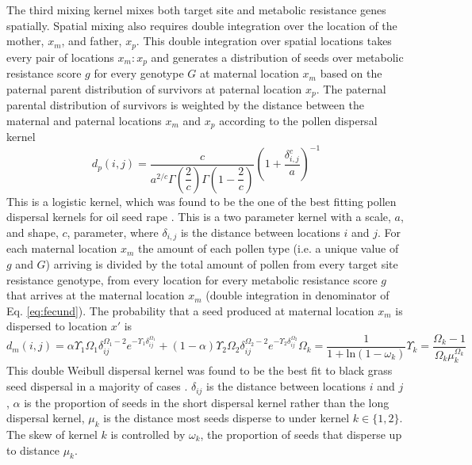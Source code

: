 \documentclass[12pt, a4paper]{article}
\begin{document}
The third mixing kernel mixes both target site and metabolic resistance genes spatially. Spatial mixing also requires double integration over the location of the mother, $x_m$, and father, $x_p$. This double integration over spatial locations takes every pair of locations $x_m:x_p$ and generates a distribution of seeds over metabolic resistance score $g$ for every genotype $G$ at maternal location $x_m$ based on the paternal parent distribution of survivors at paternal location $x_p$. The paternal parental distribution of survivors is weighted by the distance between the maternal and paternal locations $x_m$ and $x_p$ according to the pollen dispersal kernel 
\begin{equation}\label{eq:pollen_disp}
	d_p(i, j) = \frac{c}{a^{2/c}\Gamma\left(\dfrac{2}{c} \right)\Gamma\left(1 - \dfrac{2}{c} \right)}\left( 1 + \dfrac{\delta_{i,j}^c}{a} \right)^{-1} 
\end{equation} 
This is a logistic kernel, which was found to be the one of the best fitting pollen dispersal kernels for oil seed rape \citep{Klei2006}. This is a two parameter kernel with a scale, $a$, and shape, $c$, parameter, where $\delta_{i,j}$ is the distance between locations $i$ and $j$. For each maternal location $x_m$ the amount of each pollen type (i.e. a unique value of $g$ and $G$) arriving is divided by the total amount of pollen from every target site resistance genotype, from every location for every metabolic resistance score $g$ that arrives at the maternal location $x_m$ (double integration in denominator of Eq. \ref{eq:fecund}). The probability that a seed produced at maternal location $x_m$ is dispersed to location $x'$ is 
\begin{subequations}\label{eq:seed_disp}
\begin{equation}\label{eq:seed_kern}
	d_m(i, j) = \alpha \Upsilon_1 \Omega_1 \delta_{ij}^{\Omega_1 - 2} e^{-\Upsilon_1 \delta_{ij}^{\Omega_1}} + (1 - \alpha) \Upsilon_2 \Omega_2 \delta_{ij}^{\Omega_2 - 2} e^{-\Upsilon_2 \delta_{ij}^{\Omega_2}}  
\end{equation}
\begin{equation}\label{eq:shape}
	\Omega_k = \frac{1}{1 + \text{ln}(1 - \omega_k)}
\end{equation}
\begin{equation}\label{eq:scale}
	\Upsilon_k = \frac{\Omega_k - 1}{\Omega_k \mu_k^{\Omega_k}}
\end{equation}
\end{subequations} 
This double Weibull dispersal kernel was found to be the best fit to black grass seed dispersal in a majority of cases \citep{Colb2001}. $\delta_{ij}$ is the distance between locations $i$ and $j$, $\alpha$ is the proportion of seeds in the short dispersal kernel rather than the long dispersal kernel, $\mu_k$ is the distance most seeds disperse to under kernel $k \in \{1, 2\}$. The skew of kernel $k$ is controlled by $\omega_k$, the proportion of seeds that disperse up to distance $\mu_k$. 
\end{document}
